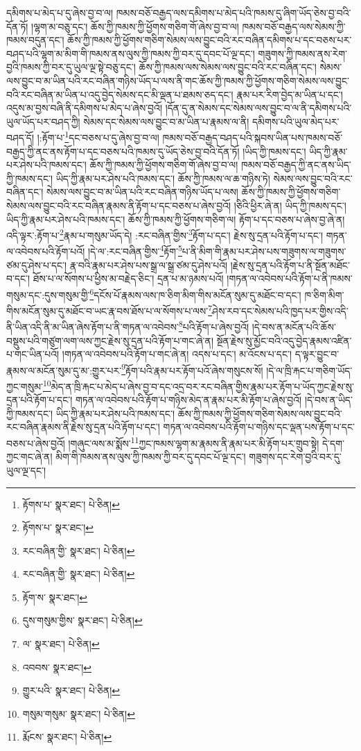 དམིགས་པ་མེད་པ་དུ་ཞེས་བྱ་བ་ལ། ཁམས་བཅོ་བརྒྱད་ལས་དམིགས་པ་མེད་པའི་ཁམས་དུ་ཞིག་ཡོད་ཅེས་བྱ་བའི་དོན་ཏོ། །ལྷག་མ་བཅུ་དང་། ཆོས་ཀྱི་ཁམས་ཀྱི་ཕྱོགས་གཅིག་གོ་ཞེས་བྱ་བ་ལ། ཁམས་བཅོ་བརྒྱད་ལས་སེམས་ཀྱི་ཁམས་བདུན་དང་། ཆོས་ཀྱི་ཁམས་ཀྱི་ཕྱོགས་གཅིག་སེམས་ལས་བྱུང་བའི་རང་བཞིན་དམིགས་པ་དང་བཅས་པར་བཤད་པའི་ལྷག་མ་མིག་གི་ཁམས་ནས་ལུས་ཀྱི་ཁམས་ཀྱི་བར་དུ་དབང་པོ་ལྔ་དང་། གཟུགས་ཀྱི་ཁམས་ནས་རེག་བྱའི་ཁམས་ཀྱི་བར་དུ་ཡུལ་ལྔ་སྟེ་བཅུ་དང་། ཆོས་ཀྱི་ཁམས་ལས་སེམས་ལས་བྱུང་བའི་རང་བཞིན་དང་། སེམས་ལས་བྱུང་བ་མ་ཡིན་པའི་རང་བཞིན་གཉིས་ཡོད་པ་ལས་ནི་གང་ཆོས་ཀྱི་ཁམས་ཀྱི་ཕྱོགས་གཅིག་སེམས་ལས་བྱུང་བའི་རང་བཞིན་མ་ཡིན་པ་འདུ་བྱེད་སེམས་དང་མི་ལྡན་པ་ཐམས་ཅད་དང་། རྣམ་པར་རིག་བྱེད་མ་ཡིན་པ་དང་། འདུས་མ་བྱས་བཞི་ནི་དམིགས་པ་མེད་པ་ཞེས་བྱའོ། །དོན་དུ་ན་སེམས་དང་སེམས་ལས་བྱུང་བ་ལ་ནི་དམིགས་པའི་ཡུལ་ཡོད་པར་བཤད་ཀྱི། སེམས་དང་སེམས་ལས་བྱུང་བ་མ་ཡིན་པ་རྣམས་ལ་ནི། དམིགས་པའི་ཡུལ་མེད་པར་བཤད་དོ། །:རྟོག་པ་\footnote{རྟོགས་པ་  སྣར་ཐང་།  པེ་ཅིན། }དང་བཅས་པ་དུ་ཞེས་བྱ་བ་ལ། ཁམས་བཅོ་བརྒྱད་བཤད་པའི་སྐབས་ཡིན་པས་ཁམས་བཅོ་བརྒྱད་ཀྱི་ནང་ནས་རྟོག་པ་དང་བཅས་པའི་ཁམས་དུ་ཡོད་ཅེས་བྱ་བའི་དོན་ཏོ། །ཡིད་ཀྱི་ཁམས་དང་། ཡིད་ཀྱི་རྣམ་པར་ཤེས་པའི་ཁམས་དང་། ཆོས་ཀྱི་ཁམས་ཀྱི་ཕྱོགས་གཅིག་གོ་ཞེས་བྱ་བ་ལ། ཁམས་བཅོ་བརྒྱད་ཀྱི་ནང་ནས་ཡིད་ཀྱི་ཁམས་དང་། ཡིད་ཀྱི་རྣམ་པར་ཤེས་པའི་ཁམས་དང་། ཆོས་ཀྱི་ཁམས་ལ་ཆ་གཉིས་ཏེ། སེམས་ལས་བྱུང་བའི་རང་བཞིན་དང་། སེམས་ལས་བྱུང་བ་མ་ཡིན་པའི་རང་བཞིན་གཉིས་ཡོད་པ་ལས། ཆོས་ཀྱི་ཁམས་ཀྱི་ཕྱོགས་གཅིག་སེམས་ལས་བྱུང་བའི་རང་བཞིན་རྣམས་ནི་རྟོག་པ་དང་བཅས་པ་ཞེས་བྱའོ། །ཅིའི་ཕྱིར་ཞེ་ན། ཡིད་ཀྱི་ཁམས་དང་། ཡིད་ཀྱི་རྣམ་པར་ཤེས་པའི་ཁམས་དང་། ཆོས་ཀྱི་ཁམས་ཀྱི་ཕྱོགས་གཅིག་ལ། རྟོག་པ་དང་བཅས་པ་ཞེས་བྱ་ཞེ་ན། འདི་ལྟར་:རྟོག་པ་\footnote{རྟོགས་པ་  སྣར་ཐང་། }རྣམ་པ་གསུམ་ཡོད་དེ། :རང་བཞིན་གྱིས་\footnote{རང་བཞིན་གྱི་  སྣར་ཐང་།  པེ་ཅིན། }རྟོག་པ་དང་། རྗེས་སུ་དྲན་པའི་རྟོག་པ་དང་། གཏན་ལ་འབེབས་པའི་རྟོག་པའོ། །དེ་ལ་:རང་བཞིན་གྱིས་\footnote{རང་བཞིན་གྱི་  སྣར་ཐང་།  པེ་ཅིན། }རྟོག་\footnote{རྟོག་ས་  སྣར་ཐང་། }པ་ནི་མིག་གི་རྣམ་པར་ཤེས་པས་གཟུགས་ལ་གཟུགས་ཙམ་དུ་ཤེས་པ་དང་། རྣ་བའི་རྣམ་པར་ཤེས་པས་སྒྲ་ལ་སྒྲ་ཙམ་དུ་ཤེས་པའོ། །རྗེས་སུ་དྲན་པའི་རྟོག་པ་ནི་སྔོན་མཐོང་བ་དང་། ཐོས་པ་ལ་སོགས་པ་ཕྱིས་མ་བརྗེད་ཅིང་། དྲན་པ་མ་ཉམས་པའོ། །གཏན་ལ་འབེབས་པའི་རྟོག་པ་ནི་ཁམས་གསུམ་དང་:དུས་གསུམ་གྱི་\footnote{དུས་གསུམ་གྱིས་  སྣར་ཐང་།  པེ་ཅིན། }དངོས་པོ་རྣམས་ལས་ཁ་ཅིག་མིག་གིས་མངོན་སུམ་དུ་མཐོང་བ་དང་། ཁ་ཅིག་མིག་གིས་མངོན་སུམ་དུ་མཐོང་བ་ཡང་རྣ་བས་ཐོས་པ་ལ་སོགས་པ་ལས་\footnote{ལ་  སྣར་ཐང་།  པེ་ཅིན། }ཤེས་རབ་དང་སེམས་པའི་ཁྱད་པར་གྱིས་འདི་ནི་ཡིན་འདི་ནི་མ་ཡིན་ཞེས་རྟོག་པ་ནི་གཏན་ལ་འབེབས་\footnote{འབབས་  སྣར་ཐང་། }པའི་རྟོག་པ་ཞེས་བྱའོ། །དེ་བས་ན་མངོན་པའི་ཆོས་བསྡུས་པའི་གཙུག་ལག་ལས་ཀྱང་རྗེས་སུ་དྲན་པའི་རྟོག་པ་གང་ཞེ་ན། སྔོན་རྗེས་སུ་མྱོང་བའི་འདུ་བྱེད་རྣམས་འཛིན་པ་གང་ཡིན་པའོ། །གཏན་ལ་འབེབས་པའི་རྟོག་པ་གང་ཞེ་ན། འདས་པ་དང་། མ་འོངས་པ་དང་། ད་ལྟར་བྱུང་བ་རྣམས་ལ་མངོན་སུམ་དུ་མ་:གྱུར་པར་\footnote{གྱུར་པའི་  སྣར་ཐང་།  པེ་ཅིན། }རྟོག་པའི་རྣམ་པར་རྟོག་པའོ་ཞེས་གསུངས་སོ། །དེ་ལ་ཁྲི་རྐང་པ་གཅིག་ཡོད་ཀྱང་གསུམ་\footnote{གསུམ་གསུམ་  སྣར་ཐང་།  པེ་ཅིན། }མེད་ན་ཁྲི་རྐང་པ་མེད་པ་ཞེས་བྱ་བ་དང་འདྲ་བར་རང་བཞིན་གྱིས་རྣམ་པར་རྟོག་པ་ཡོད་ཀྱང་རྗེས་སུ་དྲན་པའི་རྟོག་པ་དང་། གཏན་ལ་འབེབས་པའི་རྟོག་པ་གཉིས་མེད་ན་རྣམ་པར་མི་རྟོག་པ་ཞེས་བྱའོ། །དེ་བས་ན་ཡིད་ཀྱི་ཁམས་དང་། ཡིད་ཀྱི་རྣམ་པར་ཤེས་པའི་ཁམས་དང་། ཆོས་ཀྱི་ཁམས་ཀྱི་ཕྱོགས་གཅིག་སེམས་ལས་བྱུང་བའི་རང་བཞིན་རྣམས་ནི་རྗེས་སུ་དྲན་པའི་རྟོག་པ་དང་། གཏན་ལ་འབེབས་པའི་རྟོག་པ་གཉིས་དང་ལྡན་པས་རྟོག་པ་དང་བཅས་པ་ཞེས་བྱའོ། །གཞུང་ལས་མ་སྨོས་\footnote{རྨོངས་  སྣར་ཐང་།  པེ་ཅིན། }ཀྱང་ཁམས་ལྷག་མ་རྣམས་ནི་རྣམ་པར་མི་རྟོག་པར་གྲུབ་སྟེ། དེ་དག་ཀྱང་གང་ཞེ་ན། མིག་གི་ཁམས་ནས་ལུས་ཀྱི་ཁམས་ཀྱི་བར་དུ་དབང་པོ་ལྔ་དང་། གཟུགས་དང་རེག་བྱའི་བར་དུ་ཡུལ་ལྔ་དང་། 